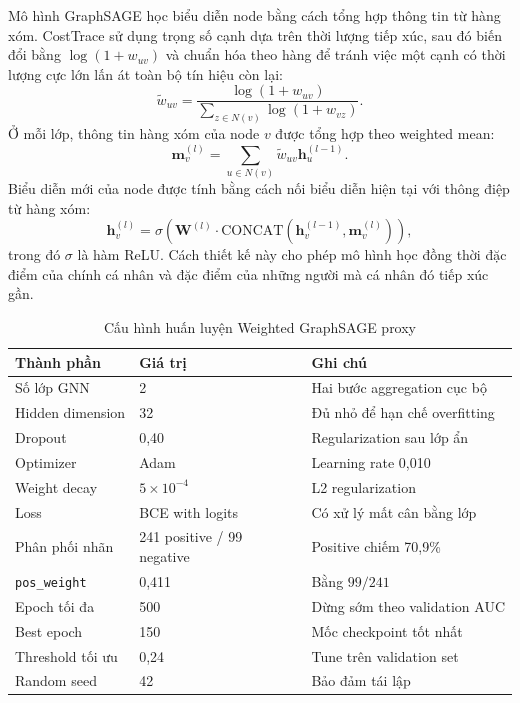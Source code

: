 \documentclass[12pt,a4paper]{report}
\theoremstyle{definition}
\begin{document}
Mô hình GraphSAGE học biểu diễn node bằng cách tổng hợp thông tin từ hàng xóm. CostTrace sử dụng trọng số cạnh dựa trên thời lượng tiếp xúc, sau đó biến đổi bằng $\log(1+w_{uv})$ và chuẩn hóa theo hàng để tránh việc một cạnh có thời lượng cực lớn lấn át toàn bộ tín hiệu còn lại:
\[
  \tilde{w}_{uv}
  =
  \frac{\log(1+w_{uv})}
  {\sum_{z \in N(v)} \log(1+w_{vz})}.
\]
Ở mỗi lớp, thông tin hàng xóm của node $v$ được tổng hợp theo weighted mean:
\[
  \mathbf{m}_v^{(l)}
  =
  \sum_{u \in N(v)} \tilde{w}_{uv}\mathbf{h}_u^{(l-1)}.
\]
Biểu diễn mới của node được tính bằng cách nối biểu diễn hiện tại với thông điệp từ hàng xóm:
\[
  \mathbf{h}_v^{(l)}
  =
  \sigma\left(
    \mathbf{W}^{(l)}
    \cdot
    \text{CONCAT}\left(\mathbf{h}_v^{(l-1)}, \mathbf{m}_v^{(l)}\right)
  \right),
  \label{eq:graphsage}
\]
trong đó $\sigma$ là hàm ReLU. Cách thiết kế này cho phép mô hình học đồng thời đặc điểm của chính cá nhân và đặc điểm của những người mà cá nhân đó tiếp xúc gần.

\begin{table}[H]
\centering
\caption{Cấu hình huấn luyện Weighted GraphSAGE proxy}
\label{tab:gnn_config}
\small
\begin{tabular}{L{5.5cm} C{3.2cm} L{5.0cm}}
\toprule
\textbf{Thành phần} & \textbf{Giá trị} & \textbf{Ghi chú}\\
\midrule
Số lớp GNN & 2 & Hai bước aggregation cục bộ\\
Hidden dimension & 32 & Đủ nhỏ để hạn chế overfitting\\
Dropout & 0,40 & Regularization sau lớp ẩn\\
Optimizer & Adam & Learning rate 0,010\\
Weight decay & $5 \times 10^{-4}$ & L2 regularization\\
Loss & BCE with logits & Có xử lý mất cân bằng lớp\\
Phân phối nhãn & 241 positive / 99 negative & Positive chiếm 70,9\%\\
\texttt{pos\_weight} & 0,411 & Bằng $99/241$\\
Epoch tối đa & 500 & Dừng sớm theo validation AUC\\
Best epoch & 150 & Mốc checkpoint tốt nhất\\
Threshold tối ưu & 0,24 & Tune trên validation set\\
Random seed & 42 & Bảo đảm tái lập\\
\bottomrule
\end{tabular}
\end{table}
\end{document}
